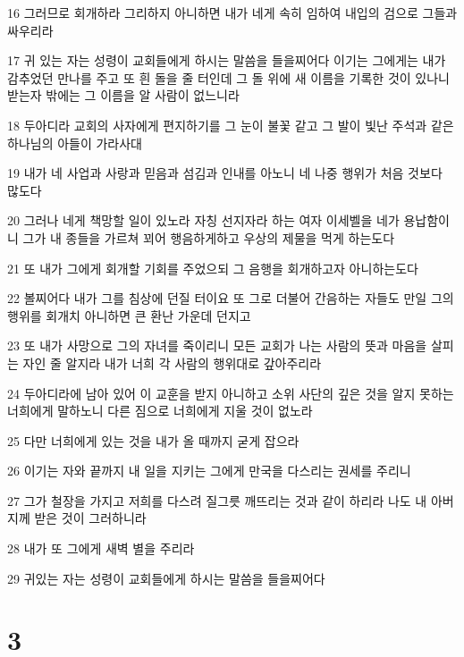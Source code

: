 \par 16 그러므로 회개하라 그리하지 아니하면 내가 네게 속히 임하여 내입의 검으로 그들과 싸우리라
\par 17 귀 있는 자는 성령이 교회들에게 하시는 말씀을 들을찌어다 이기는 그에게는 내가 감추었던 만나를 주고 또 흰 돌을 줄 터인데 그 돌 위에 새 이름을 기록한 것이 있나니 받는자 밖에는 그 이름을 알 사람이 없느니라
\par 18 두아디라 교회의 사자에게 편지하기를 그 눈이 불꽃 같고 그 발이 빛난 주석과 같은 하나님의 아들이 가라사대
\par 19 내가 네 사업과 사랑과 믿음과 섬김과 인내를 아노니 네 나중 행위가 처음 것보다 많도다
\par 20 그러나 네게 책망할 일이 있노라 자칭 선지자라 하는 여자 이세벨을 네가 용납함이니 그가 내 종들을 가르쳐 꾀어 행음하게하고 우상의 제물을 먹게 하는도다
\par 21 또 내가 그에게 회개할 기회를 주었으되 그 음행을 회개하고자 아니하는도다
\par 22 볼찌어다 내가 그를 침상에 던질 터이요 또 그로 더불어 간음하는 자들도 만일 그의 행위를 회개치 아니하면 큰 환난 가운데 던지고
\par 23 또 내가 사망으로 그의 자녀를 죽이리니 모든 교회가 나는 사람의 뜻과 마음을 살피는 자인 줄 알지라 내가 너희 각 사람의 행위대로 갚아주리라
\par 24 두아디라에 남아 있어 이 교훈을 받지 아니하고 소위 사단의 깊은 것을 알지 못하는 너희에게 말하노니 다른 짐으로 너희에게 지울 것이 없노라
\par 25 다만 너희에게 있는 것을 내가 올 때까지 굳게 잡으라
\par 26 이기는 자와 끝까지 내 일을 지키는 그에게 만국을 다스리는 권세를 주리니
\par 27 그가 철장을 가지고 저희를 다스려 질그릇 깨뜨리는 것과 같이 하리라 나도 내 아버지께 받은 것이 그러하니라
\par 28 내가 또 그에게 새벽 별을 주리라
\par 29 귀있는 자는 성령이 교회들에게 하시는 말씀을 들을찌어다

\chapter{3}

